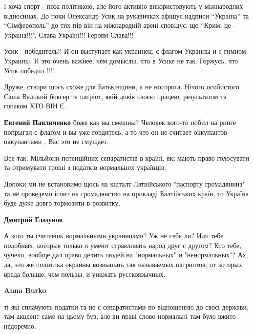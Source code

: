 \begin{itemize}
\begin{itemize}
І хоча спорт - поза політикою, але його активно використовують у міжнародних
відносинах. До поки Олександр Усик на рукавичках афішує надписи \enquote{Україна} та
\enquote{Сімферополь} до тих пір він на міжнародній арені сповідує, що \enquote{Крим, це -
Україна!!!}. Слава Україні!!! Героям Слава!!!

\end{itemize} %


Усик - победитель!! И он выступает как украинец, с флагом Украины и с гимном
Украины. И это очень важнее, чем домыслы, что в Усике не так. Горжусь, что Усик
победил !!!!


Друже, створи щось схоже для Батьківщини, а не носорога. Нічого особистого.
Саша Великий боксер та патріот, якій довів своєю працею, результатом та гопаком
ХТО ВІН Є.

\begin{itemize} %
\textbf{Евгений Павличенко} боже как вы смешны? Человек кого-то побил на ринге попрыгал с флагом и вы уже гордитесь, а то что он не считает оккупантов- оккупантами , Вас это не смущает.
\end{itemize} %


Все так. Мільйони потенційних сепаратистів в країні, які мають право голосувати
та отримувати гроші з податків нормальних українців.

Допоки ми не встановимо щось на кшталт Латвійського "паспорту громадянина" та
не проведемо іспит на громадянство на прикладі Балтійських країн, то Україна
буде дуже довго тормозити в розвитку.

\begin{itemize} %
\textbf{Дмитрий Глазунов} 

А кого ты считаешь нормальными украинцами? Уж не себя ли? Или тебе подобных,
которые только и умеют стравливать народ друг с другом? Кто тебе, чучело,
вообще дал право делить людей на "нормальных" и "ненормальных"? Ах, да, это же
политика окраины возвышать так называемых патриотов, от которых вреда больше,
чем пользы, и унижать русскоязычных.

\textbf{Anna Burko} 

ті які сплачують податки та не є сепаратистами по відношенню до своєї держави,
там акцеент саме на цьому був, але ви праві слово нормальні там було вжито
недоречно.


\end{itemize}
\end{itemize}
